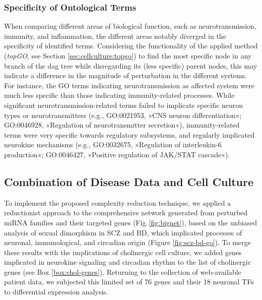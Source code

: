 \subsubsection{Specificity of Ontological Terms}
When comparing different areas of biological function, such as neurotransmission, immunity, and inflammation, the different areas notably diverged in the specificity of identified terms. Considering the functionality of the applied method (\emph{topGO}, see Section \ref{sec:cellculture:topgo}) to find the most specific node in any branch of the \ac{dag} tree while disregarding its (less specific) parent nodes, this may indicate a difference in the magnitude of perturbation in the different systems. For instance, the GO terms indicating neurotransmission as affected system were much less specific than those indicating immunity-related processes. While significant neurotransmission-related terms failed to implicate specific neuron types or neurotransmitters (e.g., GO:0021953, »CNS neuron differentiation«; GO:0046928, »Regulation of neurotransmitter secretion«), immunity-related terms were very specific towards regulatory subsystems, and regularly implicated neurokine mechanisms (e.g., GO:0032675, »Regulation of interleukin-6 production«; GO:0046427, »Positive regulation of JAK/STAT cascade«).

\subsection{Combination of Disease Data and Cell Culture}
To implement the proposed complexity reduction technique, we applied a reductionist approach to the comprehensive network generated from perturbed miRNA families and their targeted genes (Fig.\,\ref{fig:bignet}), based on the unbiased analysis of sexual dimorphism in SCZ and BD, which implicated processes of neuronal, immunological, and circadian origin (Figure \ref{fig:scz-bd-go}). To merge these results with the implications of cholinergic cell culture, we added genes implicated in neurokine signaling and circadian rhythm to the list of cholinergic genes (see Box \ref{box:chol-genes}). Returning to the collection of web-available patient data, we subjected this limited set of 76 genes and their 18 neuronal TFs to differential expression analysis.


